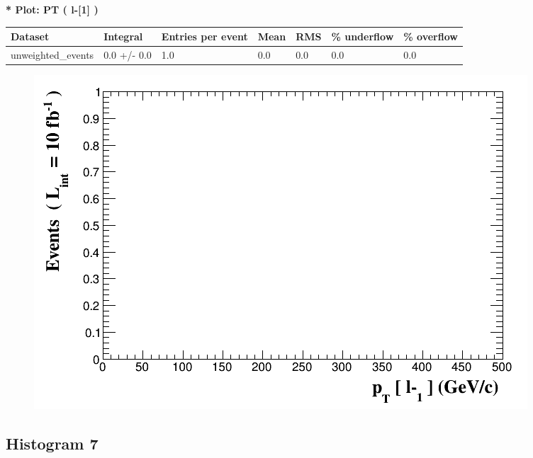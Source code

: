 \documentclass[a4paper, 10pt]{article}
\begin{document}
\textbf{* Plot: PT ( l-[1] ) }\\
   \begin{table}[H]
  \begin{center}
    \begin{tabular}{|m{23.0mm}|m{23.0mm}|m{18.0mm}|m{19.0mm}|m{19.0mm}|m{19.0mm}|m{19.0mm}|}
      \hline
      {\cellcolor{yellow}         Dataset}& {\cellcolor{yellow}         Integral}& {\cellcolor{yellow}         Entries per event}& {\cellcolor{yellow}         Mean}& {\cellcolor{yellow}         RMS}& {\cellcolor{yellow}         \% underflow}& {\cellcolor{yellow}         \% overflow}\\
      \hline
      {\cellcolor{white}         unweighted\_events}& {\cellcolor{white}         0.0 +/\-- 0.0}& {\cellcolor{white}         1.0}& {\cellcolor{white}         0.0}& {\cellcolor{white}         0.0}& {\cellcolor{green}         0.0}& {\cellcolor{green}         0.0}\\
\hline
    \end{tabular}
  \end{center}
\end{table}

\begin{figure}[H]
  \begin{center}
    \includegraphics[scale=0.45]{selection_5.png}\\
\caption{   }
  \end{center}
\end{figure}
      \newpage
\subsection{ Histogram 7}
\end{document}
